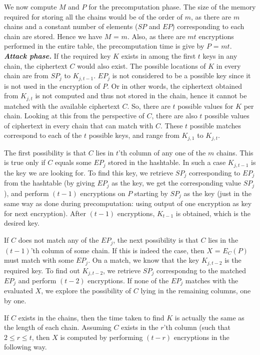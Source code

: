 We now compute $M$ and $P$ for the precomputation phase. The size of the memory required for storing all the chains would be of the order of $m$, as there are $m$ chains and a constant number of elements ($SP$ and $EP$) corresponding to each chain are stored. Hence we have $M$ = $m$. Also, as there are $mt$ encryptions performed in the entire table, the precomputation time is give by $P$ = $mt$.\\

\noindent \textit{\textbf{Attack phase.}} If the required key $K$ exists in among the first $t$ keys in any chain, the ciphertext $C$ would also exist. The possible locations of $K$ in every chain are from $SP_j$ to $K_{j,t-1}$. $EP_j$ is not considered to be a possible key since it is not used in the encryption of $P$. Or in other words, the ciphertext obtained from $K_{j,t}$ is not computed and thus not stored in the chain, hence it cannot be matched with the available ciphertext $C$. So, there are $t$ possible values for $K$ per chain. Looking at this from the perspective of $C$, there are also $t$ possible values of ciphertext in every chain that can match with $C$. These $t$ possible matches correspond to each of the $t$ possible keys, and range from $K_{j,1}$ to $K_{j,t}$.

The first possibility is that $C$ lies in $t$'th column of any one of the $m$ chains. This is true only if $C$ equals some $EP_j$ stored in the hashtable. In such a case $K_{j,t-1}$ is the key we are looking for. To find this key, we retrieve $SP_j$ corresponding to $EP_j$ from the hashtable (by giving $EP_j$ as the key, we get the corresponding value $SP_j$), and perform $(t-1)$ encryptions on $P$ starting by $SP_j$ as the key (just in the same way as done during precomputation: using output of one encryption as key for next encryption). After $(t-1)$ encryptions, $K_{t-1}$ is obtained, which is the desired key. 

If $C$ does not match any of the $EP_j$, the next possibility is that $C$ lies in the $(t-1)$'th column of some chain. If this is indeed the case, then $X$ = $E_{C}(P)$ must match with some $EP_j$. On a match, we know that the key $K_{j,t-2}$ is the required key. To find out $K_{j,t-2}$, we retrieve $SP_j$ correspondng to the matched $EP_j$ and perform $(t-2)$ encryptions. If none of the $EP_j$ matches with the evaluated $X$, we explore the possibility of $C$ lying in the remaining columns, one by one.

If $C$ exists in the chains, then the time taken to find $K$ is actually the same as the length of each chain. Assuming $C$ exists in the $r$'th column (such that  $2 \leq r \leq t$, then $X$ is computed by performing $(t-r)$ encryptions in the following way.

